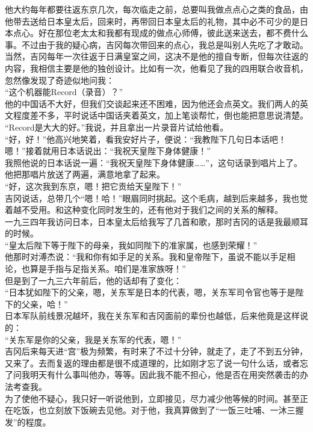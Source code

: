 他大约每年都要往返东京几次，每次临走之前，总要叫我做点点心之类的食品，由他带去送给日本皇太后，回来时，再带回日本皇太后的礼物，其中必不可少的是日本点心。好在那位老太太和我都有现成的做点心师傅，彼此送来送去，都不费什么事。不过由于我的疑心病，吉冈每次带回来的点心，我总是叫别人先吃了才敢动。\\

当然，吉冈每年一次往返于日满皇室之间，这决不是他的擅自专断，但每次往返的内容，我相信主要是他的独创设计。比如有一次，他看见了我的四用联合收音机，忽然像发现了奇迹似地问我：\\

“这个机器能Record（录音）？”\\

他的中国话不大好，但我们交谈起来还不困难，因为他还会点英文。我们两人的英文程度差不多，平时说话中国话夹着英文，加上笔谈帮忙，倒也能把意思说清楚。\\

“Record是大大的好。”我说，并且拿出一片录音片试给他看。\\

“好，好！”他高兴地笑着，看我安好片子，便说：“我教陛下几句日本话吧！嗯！”接着就用日本话说出：“我祝天皇陛下身体健康！”\\

我照他说的日本话说一遍：“我祝天皇陛下身体健康……”，这句话录到唱片上了。他把那唱片放送了两遍，满意地拿了起来。\\

“好，这次我到东京，嗯！把它贡给天皇陛下！”\\

吉冈说话，总带几个“嗯！哈！”眼眉同时挑起。这个毛病，越到后来越多，我也觉着越不受用。和这种变化同时发生的，还有他对于我们之间的关系的解释。\\

一九三四年我访问日本，日本皇太后给我写了几首和歌，那时吉冈的话是我最顺耳的时候。\\

“皇太后陛下等于陛下的母亲，我如同陛下的准家属，也感到荣耀！”\\

他那时对溥杰说：“我和你有如手足的关系。我和皇帝陛下，虽说不能以手足相论，也算是手指与足指关系。咱们是准家族呀！”\\

但是到了一九三六年前后，他的话却有了变化：\\

“日本犹如陛下的父亲，嗯，关东军是日本的代表，嗯，关东军司令官也等于是陛下的父亲，哈！”\\

日本军队前线景况越坏，我在关东军和吉冈面前的辈份也越低，后来他竟是这样说的：\\

“关东军是你的父亲，我是关东军的代表，嗯！”\\

吉冈后来每天进“宫”极为频繁，有时来了不过十分钟，就走了，走了不到五分钟，又来了。去而复返的理由都是很不成道理的，比如刚才忘了说一句什么话，或者忘了问我明天有什么事叫他办，等等。因此我不能不担心，他是否在用突然袭击的办法考查我。\\

为了使他不疑心，我只好一听说他到，立即接见，尽力减少他等候的时间。甚至正在吃饭，也立刻放下饭碗去见他。对于他，我真算做到了“一饭三吐哺、一沐三握发”的程度。\\